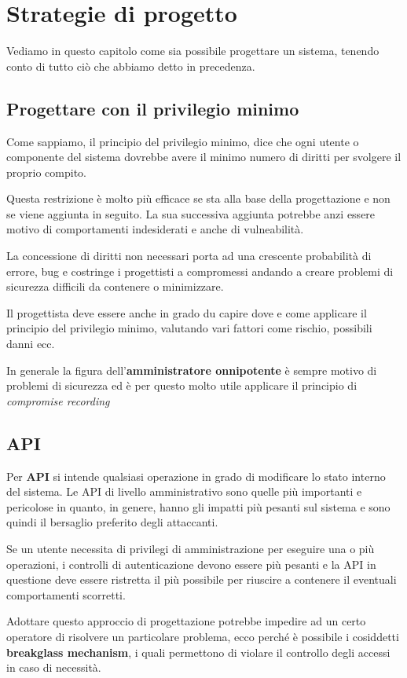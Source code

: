 \chapter{Strategie di progetto}
Vediamo in questo capitolo come sia possibile progettare un sistema, tenendo conto di tutto ciò che abbiamo detto in
precedenza.

\section{Progettare con il privilegio minimo}
Come sappiamo, il principio del privilegio minimo, dice che ogni utente o componente del sistema dovrebbe avere il
minimo numero di diritti per svolgere il proprio compito.

Questa restrizione è molto più efficace se sta alla base della progettazione e non se viene aggiunta in seguito. La
sua successiva aggiunta potrebbe anzi essere motivo di comportamenti indesiderati e anche di vulneabilità.

La concessione di diritti non necessari porta ad una crescente probabilità di errore, bug e costringe i progettisti a
compromessi andando a creare problemi di sicurezza difficili da contenere o minimizzare.

Il progettista deve essere anche in grado du  capire dove e come applicare il principio del privilegio minimo, valutando
vari fattori come rischio, possibili danni ecc.

In generale la figura dell'\textbf{amministratore onnipotente} è sempre motivo di problemi di sicurezza ed è per questo
molto utile applicare il principio di \emph{compromise recording}

\section{API}
Per \textbf{API} si intende qualsiasi operazione in grado di modificare lo stato interno del sistema. Le API di livello
amministrativo sono quelle più importanti e pericolose in quanto, in genere, hanno gli impatti più pesanti sul sistema
e sono quindi il bersaglio preferito degli attaccanti.

Se un utente necessita di privilegi di amministrazione per eseguire una o più operazioni, i controlli di autenticazione
devono essere più pesanti e la API in questione deve essere ristretta il più possibile per riuscire a contenere il
eventuali comportamenti scorretti.

Adottare questo approccio di progettazione potrebbe impedire ad un certo operatore di risolvere un particolare problema,
ecco perché è possibile i cosiddetti \textbf{breakglass mechanism}, i quali permettono di violare il controllo degli
accessi in caso di necessità.

